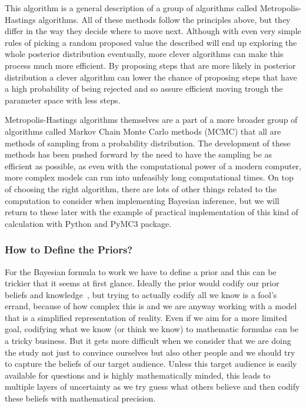 \documentclass[12pt,a4paper,leqno]{report}
\theoremstyle{plain}
\theoremstyle{definition}
\theoremstyle{remark}
\begin{document}
This algorithm is a general description of a group of algorithms called
Metropolis-Hastings algorithms. All of these methods follow the principles
above, but they differ in the way they decide where to move next. Although with
even very simple rules of picking a random proposed value the described will end
up exploring the whole posterior distribution eventually, more clever algorithms
can make this process much more efficient. By proposing steps that are more
likely in posterior distribution a clever algorithm can lower the chance of
proposing steps that have a high probability of being rejected and so assure
efficient moving trough the parameter space with less steps.

Metropolis-Hastings algorithms themselves are a part of a more broader group of
algorithms called Markov Chain Monte Carlo methods (MCMC) that all are methods of
sampling from a probability distribution. The development of these methods has
been pushed forward by the need to have the sampling be as efficient as
possible, as even with the computational power of a modern computer, more complex
models can run into unfeasibly long computational times. On top of choosing the
right algorithm, there are lots of other things related to the computation to
consider when implementing Bayesian inference, but we will return to these later
with the example of practical implementation of this kind of calculation with
Python and PyMC3 package.

\subsubsection{How to Define the Priors?}\label{bayesproblems}

For the Bayesian formula to work we have to define a prior and this can be
trickier that it seems at first glance. Ideally the prior would codify our prior
beliefs and knowledge\ \cite{gelman, kruschke}, but trying to actually codify all we
know is a fool's errand, because of how complex this is and we are
anyway working with a model that is a simplified representation of reality. Even if
we aim for a more limited goal, codifying what we know (or think we know)
to mathematic formulas can be a tricky business. But it gets more
difficult when we consider that we are doing the study not just to convince ourselves
but also other people and we should try to capture the beliefs of our target audience.
Unless this target audience is easily available for questions and is highly mathematically minded,
this leads to multiple layers of uncertainty as we try guess what others
believe and then codify these beliefs with mathematical precision.
\end{document}
